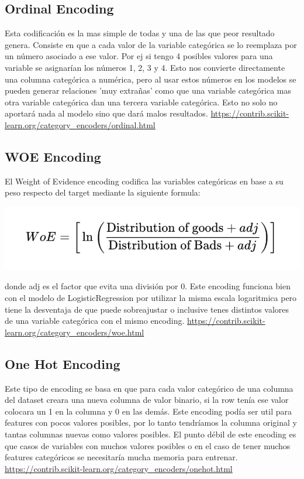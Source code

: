 \documentclass[12pt,a4paper]{article}
\begin{document}
\subsection{Ordinal Encoding}
Esta codificación es la mas simple de todas y una de las que peor resultado genera. Consiste en que a cada valor de la variable categórica se lo reemplaza por un número asociado a ese valor. Por ej si tengo 4 posibles valores para una variable se asignarían los números 1, 2, 3 y 4.
Esto nos convierte directamente una columna categórica a numérica, pero al usar estos números en los modelos se pueden generar relaciones 'muy extrañas' como que una variable categórica mas otra variable categórica dan una tercera variable categórica. Esto no solo no aportará nada al modelo sino que dará malos resultados.
\url{https://contrib.scikit-learn.org/category_encoders/ordinal.html}

\subsection{WOE Encoding}
El Weight of Evidence encoding codifica las variables categóricas en base a su peso respecto del target mediante la siguiente formula:
\begin{center}
    \includegraphics[scale=0.5]{imgs/WOE.png}
\end{center}
donde adj es el factor que evita una división por 0.
Este encoding funciona bien con el modelo de LogisticRegression por utilizar la misma escala logaritmica pero tiene la desventaja de que puede sobreajustar o inclusive tenes distintos valores de una variable categórica con el mismo encoding. 
\url{https://contrib.scikit-learn.org/category_encoders/woe.html}

\subsection{One Hot Encoding}
Este tipo de encoding se basa en que para cada valor categórico de una columna del dataset creara una nueva columna de valor binario, si la row tenía ese valor colocara un 1 en la columna y 0 en las demás. Este encoding podía ser util para features con pocos valores posibles, por lo tanto tendríamos la columna original y tantas columnas nuevas como valores posibles. El punto débil de este encoding es que casos de variables con muchos valores posibles o en el caso de tener muchos features categóricos se necesitaría mucha memoria para entrenar.
\url{https://contrib.scikit-learn.org/category_encoders/onehot.html}
\end{document}
